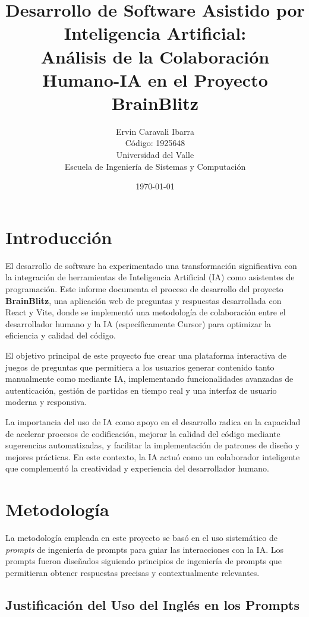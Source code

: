 \documentclass[12pt,a4paper]{article}
\title{\textbf{Desarrollo de Software Asistido por Inteligencia Artificial:\\
Análisis de la Colaboración Humano-IA en el Proyecto BrainBlitz}}
\author{Ervin Caravali Ibarra\\
Código: 1925648\\
Universidad del Valle\\
Escuela de Ingeniería de Sistemas y Computación}
\date{\today}
\begin{document}
\maketitle

\newpage

\tableofcontents

\newpage

\section{Introducción}

El desarrollo de software ha experimentado una transformación significativa con la integración de herramientas de Inteligencia Artificial (IA) como asistentes de programación. Este informe documenta el proceso de desarrollo del proyecto \textbf{BrainBlitz}, una aplicación web de preguntas y respuestas desarrollada con React y Vite, donde se implementó una metodología de colaboración entre el desarrollador humano y la IA (específicamente Cursor) para optimizar la eficiencia y calidad del código.

El objetivo principal de este proyecto fue crear una plataforma interactiva de juegos de preguntas que permitiera a los usuarios generar contenido tanto manualmente como mediante IA, implementando funcionalidades avanzadas de autenticación, gestión de partidas en tiempo real y una interfaz de usuario moderna y responsiva.

La importancia del uso de IA como apoyo en el desarrollo radica en la capacidad de acelerar procesos de codificación, mejorar la calidad del código mediante sugerencias automatizadas, y facilitar la implementación de patrones de diseño y mejores prácticas. En este contexto, la IA actuó como un colaborador inteligente que complementó la creatividad y experiencia del desarrollador humano.

\section{Metodología}

La metodología empleada en este proyecto se basó en el uso sistemático de \textit{prompts} de ingeniería de prompts para guiar las interacciones con la IA. Los prompts fueron diseñados siguiendo principios de ingeniería de prompts que permitieran obtener respuestas precisas y contextualmente relevantes.

\subsection{Justificación del Uso del Inglés en los Prompts}
\end{document}
